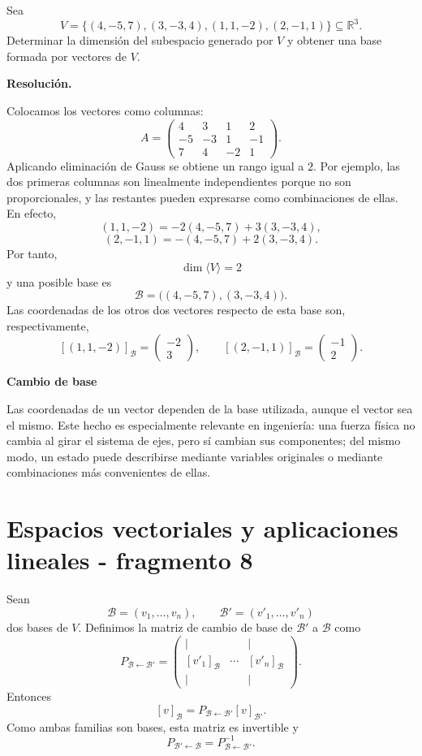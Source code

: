 \begin{solvedexercise}
Sea
\[
V=\{(4,-5,7),(3,-3,4),(1,1,-2),(2,-1,1)\}\subseteq\mathbb{R}^3.
\]
Determinar la dimensión del subespacio generado por $V$ y obtener una base formada por vectores de $V$.

\textbf{Resolución.}\par\smallskip
Colocamos los vectores como columnas:
\[
A=
\begin{pmatrix}
4&3&1&2\\
-5&-3&1&-1\\
7&4&-2&1
\end{pmatrix}.
\]
Aplicando eliminación de Gauss se obtiene un rango igual a $2$. Por ejemplo, las dos primeras columnas son linealmente independientes porque no son proporcionales, y las restantes pueden expresarse como combinaciones de ellas. En efecto,
\[
(1,1,-2)=-2(4,-5,7)+3(3,-3,4),
\]
\[
(2,-1,1)=-(4,-5,7)+2(3,-3,4).
\]
Por tanto,
\[
\boxed{\dim\langle V\rangle=2}
\]
y una posible base es
\[
\boxed{\mathcal B=\bigl((4,-5,7),(3,-3,4)\bigr).}
\]
Las coordenadas de los otros dos vectores respecto de esta base son, respectivamente,
\[
[(1,1,-2)]_{\mathcal B}=\begin{pmatrix}-2\\3\end{pmatrix},
\qquad
[(2,-1,1)]_{\mathcal B}=\begin{pmatrix}-1\\2\end{pmatrix}.
\]
\end{solvedexercise}

\textbf{Cambio de base}

Las coordenadas de un vector dependen de la base utilizada, aunque el vector sea el mismo. Este hecho es especialmente relevante en ingeniería: una fuerza física no cambia al girar el sistema de ejes, pero sí cambian sus componentes; del mismo modo, un estado puede describirse mediante variables originales o mediante combinaciones más convenientes de ellas.


\section{Espacios vectoriales y aplicaciones lineales - fragmento 8}
Sean
\[
\mathcal B=(v_1,\ldots,v_n),
\qquad
\mathcal B'=(v'_1,\ldots,v'_n)
\]
dos bases de $V$. Definimos la matriz de cambio de base de $\mathcal B'$ a $\mathcal B$ como
\[
P_{\mathcal B\leftarrow\mathcal B'}
=
\begin{pmatrix}
|&&|\\
[v'_1]_{\mathcal B}&\cdots&[v'_n]_{\mathcal B}\\
|&&|
\end{pmatrix}.
\]
Entonces
\[
\boxed{
[v]_{\mathcal B}
=P_{\mathcal B\leftarrow\mathcal B'}[v]_{\mathcal B'}.
}
\]
Como ambas familias son bases, esta matriz es invertible y
\[
P_{\mathcal B'\leftarrow\mathcal B}
=
P_{\mathcal B\leftarrow\mathcal B'}^{-1}.
\]

